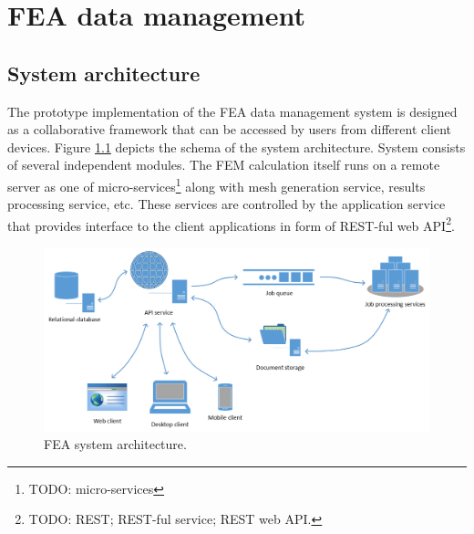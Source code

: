 \chapter{FEA data management}
\label{chapter:data-management}


\section{System architecture}
\label{sec:system-architecture}

The prototype implementation of the FEA data management system is designed as a collaborative framework that can be accessed by users from different client devices. Figure \ref{fig:FEA-architecture} depicts the schema of the system architecture. System consists of several independent modules. The FEM calculation itself runs on a remote server as one of micro-services\footnote{TODO: micro-services} along with mesh generation service, results processing service, etc. These services are controlled by the application service that provides interface to the client applications in form of REST-ful web API\footnote{TODO: REST; REST-ful service; REST web API.}.


\begin{figure}[H]
    \centering
    \includegraphics[width=\textwidth]{figures/FEA-architecture}
    \decoRule
    \caption{FEA system architecture.}
    \label{fig:FEA-architecture}
\end{figure}


